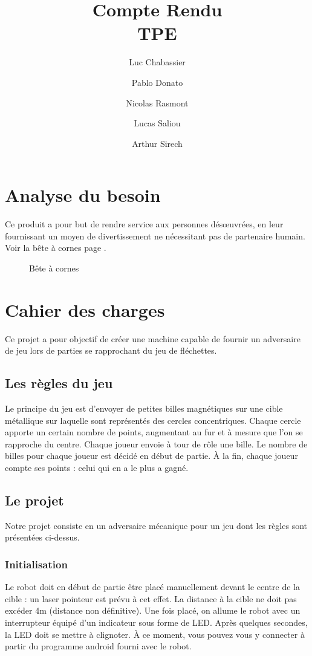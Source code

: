 \documentclass{article}
\title{Compte Rendu\\TPE}
\author{Luc Chabassier \and Pablo Donato \and Nicolas Rasmont \and Lucas Saliou \and Arthur Sirech}
\begin{document}
\maketitle
\tableofcontents

\section{Analyse du besoin}
Ce produit a pour but de rendre service aux personnes désœuvrées, en leur fournissant un moyen de divertissement ne nécessitant pas de partenaire humain. Voir la bête à cornes page \pageref{bete_cornes}.
\begin{figure}
	\begin{center}
		
	\end{center}
	\caption{Bête à cornes}
	\label{bete_cornes}
\end{figure}

\section{Cahier des charges}
Ce projet a pour objectif de créer une machine capable de fournir un adversaire de jeu lors de parties se rapprochant du jeu de fléchettes.

\subsection{Les règles du jeu}
Le principe du jeu est d'envoyer de petites billes magnétiques sur une cible métallique sur laquelle sont représentés des cercles concentriques. Chaque cercle apporte un certain nombre de points, augmentant au fur et à mesure que l'on se rapproche du centre. Chaque joueur envoie à tour de rôle une bille. Le nombre de billes pour chaque joueur est décidé en début de partie. À la fin, chaque joueur compte ses points : celui qui en a le plus a gagné.

\subsection{Le projet}
Notre projet consiste en un adversaire mécanique pour un jeu dont les règles sont présentées ci-dessus.

\subsubsection{Initialisation}
Le robot doit en début de partie être placé manuellement devant le centre de la cible : un laser pointeur est prévu à cet effet. La distance à la cible ne doit pas excéder 4m (distance non définitive). Une fois placé, on allume le robot avec un interrupteur équipé d'un indicateur sous forme de LED. Après quelques secondes, la LED doit se mettre à clignoter. À ce moment, vous pouvez vous y connecter à partir du programme android fourni avec le robot.
\end{document}
